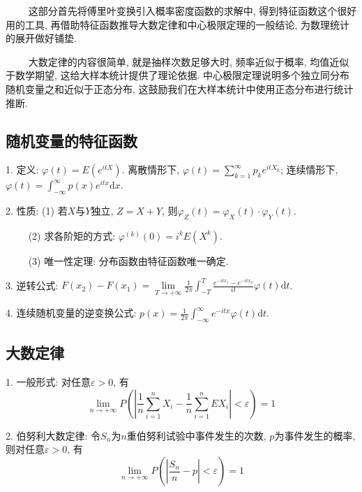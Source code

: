 \begin{tcolorbox}[colback=red!5,colframe=red!75!black]
    ~~~~ 这部分首先将傅里叶变换引入概率密度函数的求解中, 得到特征函数这个很好用的工具, 再借助特征函数推导大数定律和中心极限定理的一般结论, 为数理统计的展开做好铺垫.
    
    ~~~~ 大数定律的内容很简单, 就是抽样次数足够大时, 频率近似于概率, 均值近似于数学期望, 这给大样本统计提供了理论依据. 中心极限定理说明多个独立同分布随机变量之和近似于正态分布, 这鼓励我们在大样本统计中使用正态分布进行统计推断.
\end{tcolorbox}

\subsection{随机变量的特征函数}

1. 定义: $\varphi(t)=E(e^{itX})$. 离散情形下, $\varphi(t)=\sum\limits_{k=1}^\infty p_ke^{itX_k}$; 连续情形下, $\varphi(t)=\int_{-\infty}^\infty p(x)e^{itx}\mathrm{d}x$.

2. 性质: (1) 若$X$与$Y$独立, $Z=X+Y$, 则$\varphi_Z(t)=\varphi_X(t)\cdot \varphi_Y(t)$.

~~~~ (2) 求各阶矩的方式: $\varphi^{(k)}(0)=i^kE(X^k)$.

~~~~ (3) 唯一性定理: 分布函数由特征函数唯一确定.

3. 逆转公式: $F(x_2)-F(x_1)=\lim\limits_{T\rightarrow +\infty}\frac{1}{2\pi}\int_{-T}^T \frac{e^{-itx_1}-e^{-itx_2}}{it}\varphi(t)\mathrm{d}t$.

4. 连续随机变量的逆变换公式: $p(x)=\frac{1}{2\pi} \int_{-\infty}^\infty e^{-itx}\varphi(t)\mathrm{d}t$.

\subsection{大数定律}

1. 一般形式: 对任意$\varepsilon>0$, 有
\begin{equation*}
    \lim\limits_{n\rightarrow +\infty} P\left(\left| \frac{1}{n}\sum\limits_{i=1}^n X_i-\frac{1}{n}\sum\limits_{i=1}^n EX_i \right|<\varepsilon\right)=1
\end{equation*}

2. 伯努利大数定律: 令$S_n$为$n$重伯努利试验中事件发生的次数, $p$为事件发生的概率, 则对任意$\varepsilon>0$, 有
\begin{equation*}
    \lim\limits_{n\rightarrow +\infty} P\left(\left| \frac{S_n}{n}-p \right|<\varepsilon\right)=1
\end{equation*}

